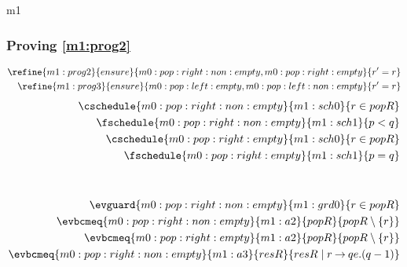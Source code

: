 \documentclass[12pt]{amsart}
\begin{document}
\begin{machine}{m1}
\subsubsection{Proving \ref{m1:prog2}}
\begin{align*}
	\refine{m1:prog2}{ensure}{m0:pop:right:non:empty,m0:pop:right:empty
	}{ \index{r}{r' = r} }
	\\ \refine{m1:prog3}{ensure}{m0:pop:left:empty,m0:pop:left:non:empty}
	{ \index{r}{r' = r} }
\end{align*}
\begin{align*}
\cschedule{m0:pop:right:non:empty}{m1:sch0}{ r \in popR }
\\ \fschedule{m0:pop:right:non:empty}{m1:sch1}{ p < q }
\\ \cschedule{m0:pop:right:empty}{m1:sch0}{ r \in popR }
\\ \fschedule{m0:pop:right:empty}{m1:sch1}{ p = q }
\\ \removecoarse{m0:pop:right:non:empty}{default} %
\\ \removecoarse{m0:pop:right:empty}{default} %
\\ \evguard{m0:pop:right:non:empty}{m1:grd0}{ r \in popR }
\\ \evbcmeq{m0:pop:right:non:empty}{m1:a2}
	{popR}{ popR \setminus \{ r \} }
\\ \evbcmeq{m0:pop:right:empty}{m1:a2}
	{popR}{ popR \setminus \{ r \} }
\\ \evbcmeq{m0:pop:right:non:empty}{m1:a3}
	{resR}{ resR \1| r \fun qe.(q-1) }
\end{align*}

\end{machine}
\end{document}

